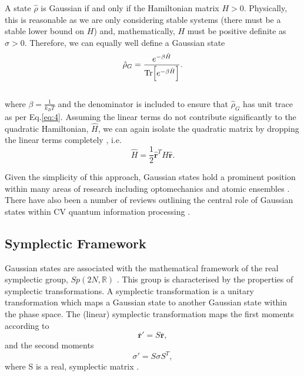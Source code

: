 \documentclass[11pt,a4paper]{article}
\numberwithin{equation}{section}
\begin{document}
	
	A state $\hat{\rho}$ is Gaussian if and only if the Hamiltonian matrix $ \mathit{H} > 0$. Physically, this is reasonable as we are only considering stable systems (there must be a stable lower bound on $H$) and, mathematically, $H$ must be positive definite as $\sigma>0$. Therefore, we can equally well define a Gaussian state
	\begin{equation} \label{eq:21}
	\hat{\rho}_G = \frac{e^{-\beta \hat{H}}}{\Tr[e^{-\beta \hat{H}}]}.
	\end{equation}\\
	where $\beta = \frac{1}{k_BT}$ and the denominator is included to ensure that $\hat{\rho}_G$ has unit trace as per Eq.\ref{eq:4}. Assuming the linear terms do not contribute significantly to the quadratic Hamiltonian, $\hat{H}$, we can again isolate the quadratic matrix by dropping the linear terms completely \cite{Genoni16}, i.e.
	\begin{equation} \label{eq:22}
	\hat{H} = \frac{1}{2}\mathbf{\hat{r}}^{T}H\mathbf{\hat{r}}.
	\end{equation}
	
	Given the simplicity of this approach, Gaussian states hold a prominent position within many areas of research including optomechanics \cite{Genoni15} and atomic ensembles \cite{Sherson}. There have also been a number of reviews outlining the central role of Gaussian states within CV quantum information processing \cite{Napoli05, Weedbrook12}. 
	
	\subsection{Symplectic Framework}
	\label{sec:symplectic}
	Gaussian states are associated with the mathematical framework of the real symplectic group, $Sp(2N, \mathbb{R})$ \cite{Arvind95}. This group is characterised by the properties of symplectic transformations. A symplectic transformation is a unitary transformation which maps a Gaussian state to another Gaussian state within the phase space. The (linear) symplectic transformation maps the first moments according to
	\begin{equation}\label{eq:23}
	\mathbf{\bar{r}}' = S \mathbf{\bar{r}},
	\end{equation}
	and the second moments
	\begin{equation}\label{eq:24}
	\sigma' = S\sigma S^T,
	\end{equation}
	where S is a real, symplectic matrix \cite{Adesso14}.
	
\end{document}
